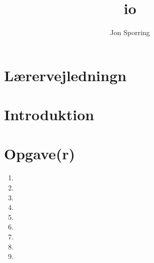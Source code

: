 \documentclass[a4paper,12pt]{article}
\title{io}
\author{Jon Sporring}
\begin{document}
\maketitle

\section{Lærervejledningn}

\section{Introduktion}

\section{Opgave(r)}
\begin{enumerate}
\item 
\item 
\item 
\item 
\item 
\item 
\item 
\item 
\item 
\end{enumerate}
\end{document}
